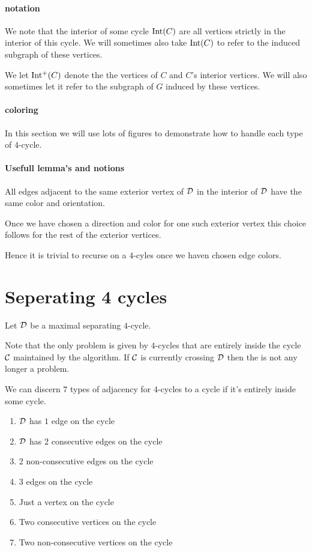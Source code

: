 
\newcommand{\D}{\scr D}

\paragraph{notation}

We note that the interior of some cycle $\operatorname{Int}(C)$ are all vertices strictly in the interior of this cycle. We will sometimes also take $\operatorname{Int}(C)$ to refer to the induced subgraph of these vertices.

We let $\operatorname{Int^{+}}(C)$ denote the the vertices of $C$ and $C$'s interior vertices. We will also sometimes let it refer to the subgraph of $G$ induced by these vertices.


\paragraph{coloring}
In this section we will use lots of figures to demonstrate how to handle each type of $4$-cycle.

\paragraph{Usefull lemma's and notions}
All edges adjacent to the same exterior vertex of $\D$ in the interior of $\D$ have the same color and orientation.

Once we have chosen a direction and color for one such exterior vertex this choice follows for the rest of the exterior vertices.

Hence it is trivial to recurse on a $4$-cyles once we haven chosen edge colors.

\section{Seperating 4 cycles}
Let $\D$ be a maximal separating $4$-cycle.

Note that the only problem is given by $4$-cycles that are entirely inside the cycle $\mathcal{C}$ maintained by the algorithm. If $\mathcal{C}$ is currently crossing $\D$ then the is not any longer a problem.

We can discern $7$ types of adjacency for $4$-cycles to a cycle if it's entirely inside some cycle.
\begin{enumerate}
  \renewcommand*{\labelenumi}{(\alph{enumi})}%
  \renewcommand*{\theenumi}{(\alph{enumi})}%

  \item $\D$ has $1$ edge on the cycle
  \label{t:1}
  \item $\D$ has 2 consecutive edges on the cycle
  \label{t:2cons}
  \item 2 non-consecutive edges on the cycle
  \label{t:2alt}
  \item 3 edges on the cycle
  \label{t:3}
  \item Just a vertex on the cycle
  \label{t:v1}
  \item Two consecutive vertices on the cycle
  \label{t:v2cons}
  \item Two non-consecutive vertices on the cycle
  \label{t:v2alt}
\end{enumerate}

